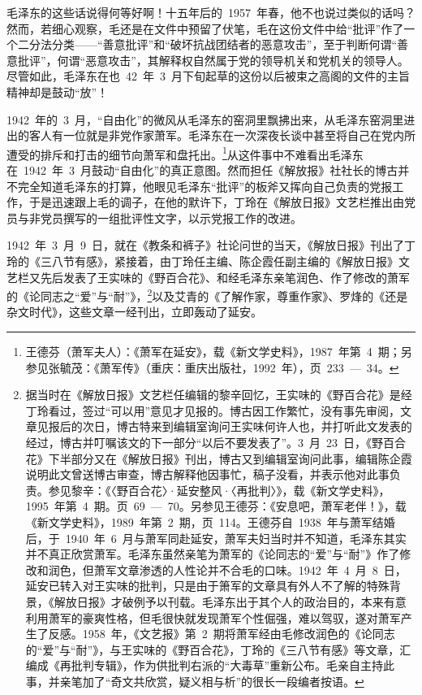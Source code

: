 毛泽东的这些话说得何等好啊！十五年后的~1957~年春，他不也说过类似的话吗？然而，若细心观察，毛还是在文件中预留了伏笔，毛在这份文件中给“批评”作了一个二分法分类——“善意批评”和“破坏抗战团结者的恶意攻击”，至于判断何谓“善意批评”，何谓“恶意攻击”，其解释权自然属于党的领导机关和党机关的领导人。尽管如此，毛泽东在也~42~年~3~月下旬起草的这份以后被束之高阁的文件的主旨精神却是鼓动“放”！

1942~年的~3~月，“自由化”的微风从毛泽东的窑洞里飘拂出来，从毛泽东窑洞里进出的客人有一位就是非党作家萧军。毛泽东在一次深夜长谈中甚至将自己在党内所遭受的排斥和打击的细节向萧军和盘托出。\footnote{王德芬（萧军夫人）：《萧军在延安》，载《新文学史料》，1987~年第~4~期；另参见张毓茂：《萧军传》（重庆：重庆出版社，1992~年），页~233~—~34。}从这件事中不难看出毛泽东在~1942~年~3~月鼓动“自由化”的真正意图。然而担任《解放报》社社长的博古并不完全知道毛泽东的打算，他眼见毛泽东“批评”的板斧又挥向自己负责的党报工作，于是迅速跟上毛的调子，在他的默许下，丁玲在《解放日报》文艺栏推出由党员与非党员撰写的一组批评性文字，以示党报工作的改进。

1942~年~3~月~9~日，就在《教条和裤子》社论问世的当天，《解放日报》刊出了丁玲的《三八节有感》，紧接着，由丁玲任主编、陈企霞任副主编的《解放日报》文艺栏又先后发表了王实味的《野百合花》、和经毛泽东亲笔润色、作了修改的萧军的《论同志之“爱”与“耐”》，\footnote{据当时在《解放日报》文艺栏任编辑的黎辛回忆，王实味的《野百合花》是经丁玲看过，签过“可以用”意见才见报的。博古因工作繁忙，没有事先审阅，文章见报后的次日，博古特来到编辑室询问王实味何许人也，并打听此文发表的经过，博古并叮嘱该文的下一部分“以后不要发表了”。3~月~23~日，《野百合花》下半部分又在《解放日报》刊出，博古又到编辑室询问此事，编辑陈企霞说明此文曾送博古审查，博古解释他因事忙，稿子没看，并表示他对此事负责。参见黎辛：《〈野百合花〉·延安整风·〈再批判〉》，载《新文学史料》，1995~年第~4~期。页~69~—~70。另参见王德芬：《安息吧，萧军老伴！》，载《新文学史料》，1989~年第~2~期，页~114。王德芬自~1938~年与萧军结婚后，于~1940~年~6~月与萧军同赴延安，萧军夫妇当时并不知道，毛泽东其实并不真正欣赏萧军。毛泽东虽然亲笔为萧军的《论同志的“爱”与“耐”》作了修改和润色，但萧军文章渗透的人性论并不合毛的口味。1942~年~4~月~8~日，延安已转入对王实味的批判，只是由于箫军的文章具有外人不了解的特殊背景，《解放日报》才破例予以刊载。毛泽东出于其个人的政治目的，本来有意利用萧军的豪爽性格，但毛很快就发现萧军个性倔强，难以驾驭，遂对萧军产生了反感。1958~年，《文艺报》第~2~期将萧军经由毛修改润色的《论同志的“爱”与“耐”》，与王实味的《野百合花》，丁玲的《三八节有感》等文章，汇编成《再批判专辑》，作为供批判右派的“大毒草”重新公布。毛亲自主持此事，并亲笔加了“奇文共欣赏，疑义相与析”的很长一段编者按语。}以及艾青的《了解作家，尊重作家》、罗烽的《还是杂文时代》，这些文章一经刊出，立即轰动了延安。

